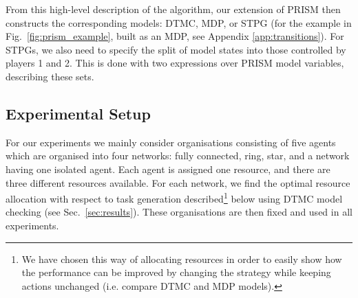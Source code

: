 \documentclass{llncs}
\begin{document}
From this high-level description of the algorithm, our extension of PRISM then constructs the corresponding models: DTMC, MDP, or STPG (for the example in Fig.~\ref{fig:prism_example}, built as an MDP, see Appendix \ref{app:transitions}).
For STPGs, we also need to specify the split of model states into those controlled by players 1 and 2.
This is done with two expressions over PRISM model variables, describing these sets.
\vspace{-10pt}
\subsection{Experimental Setup}
\label{subsec:exp_set}
For our experiments we mainly consider organisations consisting of five agents which are organised into four networks: fully connected, ring, star, and a network having one isolated agent. Each agent is assigned one resource, and there are three different resources available. For each network, we find the optimal resource allocation with respect to task generation described\footnote{We have chosen this way of allocating resources in order to easily show how the performance can be improved by changing the strategy while keeping actions unchanged (i.e. compare DTMC and MDP models).} below using DTMC model checking (see Sec.~\ref{sec:results}). These organisations are then fixed and used in all experiments.
\vspace{-15pt}
\end{document}
